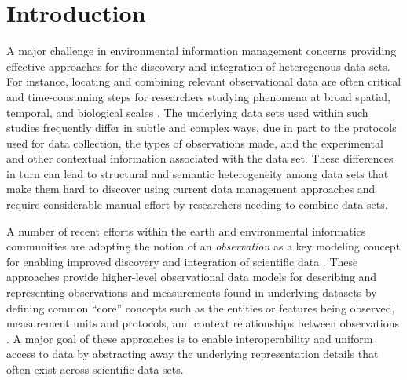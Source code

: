
\section{Introduction}
\label{sec-intro}

A major challenge in environmental information management concerns
providing effective approaches for the discovery and integration of
heteregenous data sets. For instance, locating and combining relevant
observational data are often critical and time-consuming steps for
researchers studying phenomena at broad spatial, temporal, and
biological scales
\cite{worm06:_impac_of_biodiv_loss_ocean_ecosy_servic,pennings05:_do,green05:_compl_in_ecolog_and_conser,sorokina09:_detec_inter_variab_inter_obser_ornit_data,jackson01:_histor_overf_and_recen_collap}. The
underlying data sets used within such studies frequently differ in
subtle and complex ways, due in part to the protocols used for data
collection, the types of observations made, and the experimental and
other contextual information associated with the data set. These
differences in turn can lead to structural and semantic heterogeneity
among data sets that make them hard to discover using current data
management approaches and require considerable manual effort by
researchers needing to combine data sets.

A number of recent efforts within the earth and environmental
informatics communities are adopting the notion of an \emph{observation} as a
key modeling concept for enabling improved discovery and integration
of scientific data
\cite{om,fox09:_ontol,tarboton07:_cuahs_commun_obser_data_model,cushing07:_compon_based_end_user_datab,balhoff10:_phenex,bowers08}. These
approaches provide higher-level observational data models for
describing and representing observations and measurements found in
underlying datasets by defining common ``core'' concepts such as the
entities or features being observed, measurement units and protocols,
and context relationships between observations \cite{om,bowers08}.  A
major goal of these approaches is to enable interoperability and
uniform access to data by abstracting away the underlying
representation details that often exist across scientific data sets.

